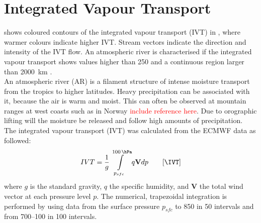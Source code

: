 \section{Integrated Vapour Transport}
\label{sec:atm_riv}
% 
 shows coloured contours of the integrated vapour transport (IVT) in \SI{}{\IVT}, where warmer colours indicate higher IVT. Stream vectors indicate the direction and intensity of the IVT flow. An atmospheric river is characterised if the integrated vapour transport shows values higher than \SI{250}{\IVT} and a continuous region larger than \SI{2000}{\km} \citep{rutz_climatological_2014}.
\\
An atmospheric river (AR) is a filament structure of intense moisture transport from the tropics to higher latitudes. 
Heavy precipitation can be associated with it, because the air is warm and moist. This can often be observed at mountain ranges at west coasts such as in Norway \textcolor{red}{include reference here}. Due to orographic lifting will the moisture be released and follow high amounts of precipitation.  
\\
The integrated vapour transport (IVT) was calculated from the ECMWF data as followed:
\begin{align}
IVT = \frac{1}{g} \int\limits_{p_{sfc}}^{\SI{100}{\hPa}} q \mathbf{V} dp \qquad [\SI{}{\IVT}]
\label{eq:IVT}
\end{align} 
where $g$ is the standard gravity, $q$ the specific humidity, and $\mathbf{V}$ the total wind vector at each pressure level $p$. The numerical, trapezoidal integration is performed by using data from the surface pressure $p_{sfc}$ to \SI{850}{\hPa} in \SI{50}{\hPa} intervals and from \SIrange{700}{100}{\hPa} in \SI{100}{\hPa} intervals.


%
